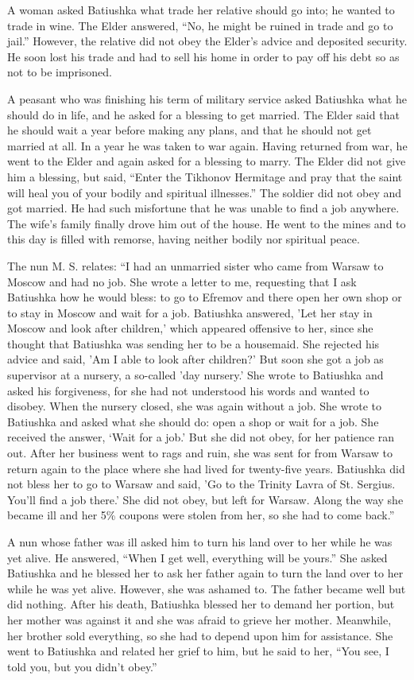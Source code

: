 A woman asked Batiushka what trade her relative should go into; he wanted to trade in wine. The Elder answered, “No, he might be ruined in trade and go to jail.” However, the relative did not obey the Elder's advice and deposited security. He soon lost his trade and had to sell his home in order to pay off his debt so as not to be imprisoned.

A peasant who was finishing his term of military service asked Batiushka what he should do in life, and he asked for a blessing to get married. The Elder said that he should wait a year before making any plans, and that he should not get married at all. In a year he was taken to war again. Having returned from war, he went to the Elder and again asked for a blessing to marry. The Elder did not give him a blessing, but said, “Enter the Tikhonov Hermitage and pray that the saint will heal you of your bodily and spiritual illnesses.” The soldier did not obey and got married. He had such misfortune that he was unable to find a job anywhere. The wife's family finally drove him out of the house. He went to the mines and to this day is filled with remorse, having neither bodily nor spiritual peace.

The nun M. S. relates: “I had an unmarried sister who came from Warsaw to Moscow and had no job. She wrote a letter to me, requesting that I ask Batiushka how he would bless: to go to Efremov and there open her own shop or to stay in Moscow and wait for a job. Batiushka answered, 'Let her stay in Moscow and look after children,' which appeared offensive to her, since she thought that Batiushka was sending her to be a housemaid. She rejected his advice and said, 'Am I able to look after children?' But soon she got a job as supervisor at a nursery, a so-called 'day nursery.' She wrote to Batiushka and asked his forgiveness, for she had not understood his words and wanted to disobey. When the nursery closed, she was again without a job. She wrote to Batiushka and asked what she should do: open a shop or wait for a job. She received the answer, ‘Wait for a job.' But she did not obey, for her patience ran out. After her business went to rags and ruin, she was sent for from Warsaw to return again to the place where she had lived for twenty-five years. Batiushka did not bless her to go to Warsaw and said, 'Go to the Trinity Lavra of St. Sergius. You'll find a job there.' She did not obey, but left for Warsaw. Along the way she became ill and her 5\% coupons were stolen from her, so she had to come back.”

A nun whose father was ill asked him to turn his land over to her while he was yet alive. He answered, “When I get well, everything will be yours.” She asked Batiushka and he blessed her to ask her father again to turn the land over to her while he was yet alive. However, she was ashamed to. The father became well but did nothing. After his death, Batiushka blessed her to demand her portion, but her mother was against it and she was afraid to grieve her mother. Meanwhile, her brother sold everything, so she had to depend upon him for assistance. She went to Batiushka and related her grief to him, but he said to her, “You see, I told you, but you didn't obey.”

